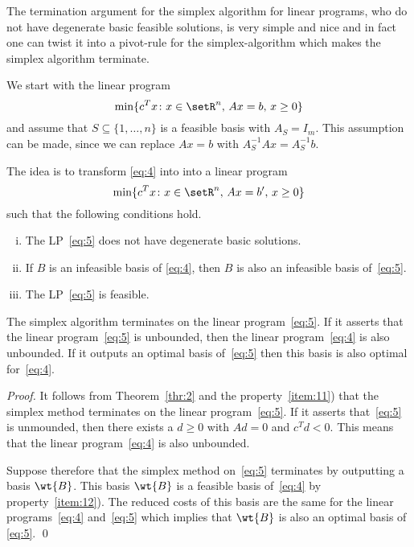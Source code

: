 The termination argument for the simplex algorithm for linear programs,
who do not have degenerate basic feasible solutions, is very simple and
nice and in fact one can twist it into a pivot-rule for the
simplex-algorithm which makes the simplex algorithm terminate.  

We start with the  linear program 
\begin{equation}
  \label{eq:4}
  \min\{c^Tx \colon x \in \setR^n, \, Ax=b, \, x\geq0\}
\end{equation}
and assume that $S\subseteq\{1,\ldots,n\}$ is a feasible basis with $A_S
=I_m$. This assumption can be made, since we can replace $Ax = b$ with
$A_S^{-1}Ax = A_S^{-1}b$.

The idea is to transform \eqref{eq:4} into 
into a linear program 
\begin{equation}
  \label{eq:5}
  \min\{c^Tx \colon x \in \setR^n, \, Ax=b', \, x\geq0\}
\end{equation}
such that the following conditions hold. 
\begin{enumerate}[i)]
\item The LP~\eqref{eq:5} does not have degenerate basic solutions. \label{item:11}
\item If $B$ is an infeasible basis of \eqref{eq:4}, then $B$ is also an
  infeasible basis of~\eqref{eq:5}. \label{item:12}
\item The LP~\eqref{eq:5} is feasible. \label{item:13}
\end{enumerate}



\begin{lemma}
  \label{lem:2}
  The simplex algorithm terminates on the linear
  program~\eqref{eq:5}. If it 
  asserts that the linear program~\eqref{eq:5} is unbounded, then the
  linear program~\eqref{eq:4} is also unbounded. If it 
  outputs an optimal basis of~\eqref{eq:5} then this basis is also
  optimal for~\eqref{eq:4}. 
\end{lemma}

\begin{proof}
  
  
  It follows from Theorem~\ref{thr:2} and the property~\ref{item:11})
  that the simplex method terminates on the linear
  program~\eqref{eq:5}. If it asserts that~\eqref{eq:5} is unmounded,
  then there exists a $d\geq0$ with $Ad=0$ and $c^Td<0$. This means that
  the linear program~\eqref{eq:4} is also unbounded. 
  
  Suppose therefore that the simplex method on~\eqref{eq:5} terminates
  by outputting a 
  basis $\wt{B}$. This basis 
  $\wt{B}$ is a feasible basis of~\eqref{eq:4} by
  property~\ref{item:12}). The reduced costs of this basis are the
  same for the linear programs~\eqref{eq:4}  and~\eqref{eq:5} which
  implies that $\wt{B}$ is also an optimal basis of \eqref{eq:5}.
  \qed 
\end{proof}


